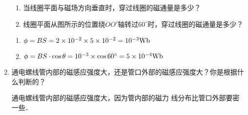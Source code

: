 \begin{enumerate}
\begin{figure}[htp]
\begin{tikzpicture}[>=latex]
	\end{tikzpicture}
	\caption{}
\end{figure}
     \begin{enumerate}
        \item 当线圈平面与磁场方向垂直时，穿过线圈的磁通量是多少？
        \item 线圈平面从图所示的位置绕$OO'$轴转过$60^\circ$时，穿过线圈的磁通量是多少？
    \end{enumerate}

   \begin{solution}
 \begin{enumerate}
     \item $\phi=BS=2\x 10^{-2}\x 5\x 10^{-2}=10^{-3}{\rm Wb}$
     \item $\phi=BS\cdot \cos\theta=10^{-3}\x \cos60^{\circ}=5\x 10^{-4}{\rm Wb}$
 \end{enumerate}
    
    \end{solution}
    
    \item 通电螺线管内部的磁感应强度大，还是管口外部的磁感应强度大？你是根据什么判断的？


    \begin{solution}
        通电螺线管内部的磁感应强度大，因为管内部的磁力
        线分布比管口外部要密一些．
    \end{solution}
    
\end{enumerate}



